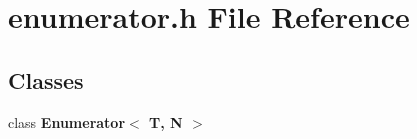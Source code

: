 \section{enumerator.h File Reference}
\label{enumerator_8h}
\subsection*{Classes}
\begin{CompactItemize}
\item 
class {\bf Enumerator$<$ T, N $>$}
\end{CompactItemize}
